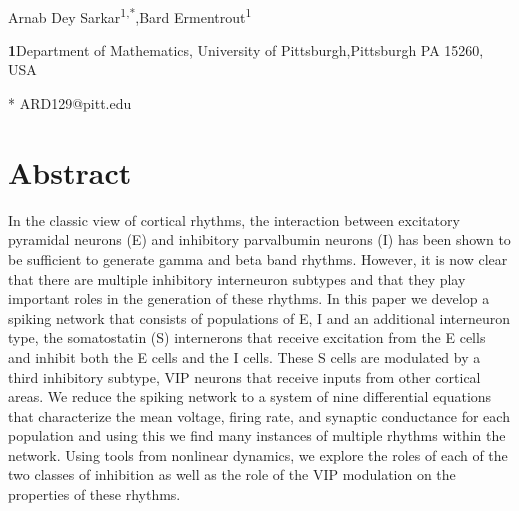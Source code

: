 \documentclass[10pt,letterpaper]{article}
\begin{document}
\vspace*{0.2in}

\begin{flushleft}
{\Large
\textbf{} %
}
\newline
\\
Arnab Dey Sarkar\textsuperscript{1,*},Bard Ermentrout\textsuperscript{1}


\bigskip
\textbf{1}Department of Mathematics,
University of Pittsburgh,Pittsburgh PA 15260, USA

\bigskip
* ARD129@pitt.edu

\end{flushleft}
\section*{Abstract}
In the classic view of cortical rhythms, the interaction between excitatory pyramidal neurons (E) and inhibitory parvalbumin neurons (I) has been shown to be sufficient to generate gamma and beta band rhythms.  However, it is now clear that there are multiple inhibitory interneuron subtypes and that they play important roles in the generation of these rhythms. In this paper we develop a spiking network that consists of populations of E, I  and an additional interneuron type, the somatostatin (S) internerons that receive excitation from the E cells and inhibit both the E cells and the I cells.   These S cells are modulated by a third inhibitory subtype, VIP neurons that receive inputs from other cortical areas.  We reduce the spiking network to a system of nine differential equations that characterize the mean voltage, firing rate, and synaptic conductance for each population and using this we find many instances of multiple rhythms within the network. Using tools from nonlinear dynamics, we explore the roles of each of the two classes of inhibition as well as the role of the VIP modulation on the properties of these rhythms.  
\end{document}
